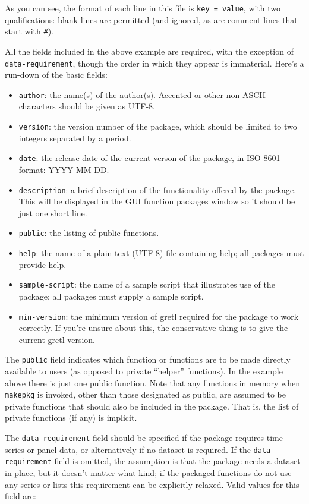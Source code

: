 As you can see, the format of each line in this file is \texttt{key =
  value}, with two qualifications: blank lines are permitted (and
ignored, as are comment lines that start with \verb|#|). 

All the fields included in the above example are required, with the
exception of \texttt{data-requirement}, though the order in which they
appear is immaterial. Here's a run-down of the basic fields:

\begin{itemize}
\item \texttt{author}: the name(s) of the author(s). Accented or other
  non-ASCII characters should be given as UTF-8.
\item \texttt{version}: the version number of the package, which should
  be limited to two integers separated by a period.
\item \texttt{date}: the release date of the current verson of the
  package, in ISO 8601 format: YYYY-MM-DD.
\item \texttt{description}: a brief description of the functionality
  offered by the package. This will be displayed in the GUI function
  packages window so it should be just one short line.
\item \texttt{public}: the listing of public functions.
\item \texttt{help}: the name of a plain text (UTF-8) file containing
  help; all packages must provide help.
\item \texttt{sample-script}: the name of a sample script that
 illustrates use of the package; all packages must supply a
 sample script.
\item \texttt{min-version}: the minimum version of gretl required
 for the package to work correctly. If you're unsure about this,
 the conservative thing is to give the current gretl version.
\end{itemize}

The \texttt{public} field indicates which function or functions are to
be made directly available to users (as opposed to private ``helper''
functions).  In the example above there is just one public
function. Note that any functions in memory when \texttt{makepkg} is
invoked, other than those designated as public, are assumed to be
private functions that should also be included in the package. That
is, the list of private functions (if any) is implicit.

The \texttt{data-requirement} field should be specified if the package
requires time-series or panel data, or alternatively if no dataset is
required.  If the \texttt{data-requirement} field is omitted, the
assumption is that the package needs a dataset in place, but it
doesn't matter what kind; if the packaged functions do not use any
series or lists this requirement can be explicitly relaxed.  Valid
values for this field are:

